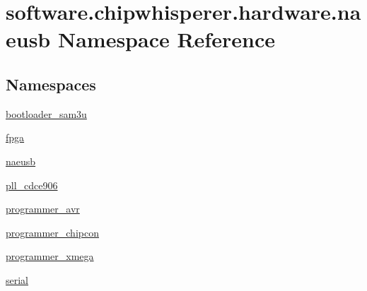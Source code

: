 \hypertarget{namespacesoftware_1_1chipwhisperer_1_1hardware_1_1naeusb}{}\section{software.\+chipwhisperer.\+hardware.\+naeusb Namespace Reference}
\label{namespacesoftware_1_1chipwhisperer_1_1hardware_1_1naeusb}
\subsection*{Namespaces}
\begin{DoxyCompactItemize}
\item 
 \hyperlink{namespacesoftware_1_1chipwhisperer_1_1hardware_1_1naeusb_1_1bootloader__sam3u}{bootloader\+\_\+sam3u}
\item 
 \hyperlink{namespacesoftware_1_1chipwhisperer_1_1hardware_1_1naeusb_1_1fpga}{fpga}
\item 
 \hyperlink{namespacesoftware_1_1chipwhisperer_1_1hardware_1_1naeusb_1_1naeusb}{naeusb}
\item 
 \hyperlink{namespacesoftware_1_1chipwhisperer_1_1hardware_1_1naeusb_1_1pll__cdce906}{pll\+\_\+cdce906}
\item 
 \hyperlink{namespacesoftware_1_1chipwhisperer_1_1hardware_1_1naeusb_1_1programmer__avr}{programmer\+\_\+avr}
\item 
 \hyperlink{namespacesoftware_1_1chipwhisperer_1_1hardware_1_1naeusb_1_1programmer__chipcon}{programmer\+\_\+chipcon}
\item 
 \hyperlink{namespacesoftware_1_1chipwhisperer_1_1hardware_1_1naeusb_1_1programmer__xmega}{programmer\+\_\+xmega}
\item 
 \hyperlink{namespacesoftware_1_1chipwhisperer_1_1hardware_1_1naeusb_1_1serial}{serial}
\end{DoxyCompactItemize}
